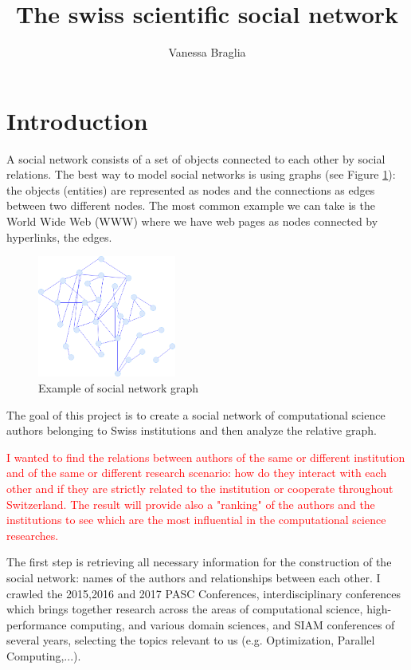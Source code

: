 \documentclass[]{usiinfbachelorproject}
\author{Vanessa Braglia}
\title{The swiss scientific social network}
\begin{document}
\newpage
\tableofcontents
\newpage

\section{Introduction} \label{sec:intro} 

A social network consists of a set of objects connected to each other by social relations. The best way to model social networks is using graphs (see Figure \ref{fig:socialnetwork}): the objects (entities) are represented as nodes and the connections as edges between two different nodes. The most common example we can take is the World Wide Web (WWW) where we have web pages as nodes connected by hyperlinks, the edges.

\begin{figure}[ht]
	\centering
	\includegraphics[height=4cm]{img/graph3.png}
	\caption{Example of social network graph}
	\label{fig:socialnetwork}
\end{figure}

The goal of this project is to create a social network of computational science authors belonging to Swiss institutions and then analyze the relative graph.

\textcolor{red}{I wanted to find the relations between authors of the same or different institution and of the same or different research scenario: how do they interact with each other and if they are strictly related to the institution or cooperate throughout Switzerland. The result will provide also a "ranking" of the authors and the institutions to see which are the most influential in the computational science researches.}

The first step is retrieving all necessary information for the construction of the social network: names of the authors and relationships between each other. I crawled the 2015,2016 and 2017 PASC Conferences, interdisciplinary conferences which brings together research across the areas of computational science, high-performance computing, and various domain sciences, and SIAM conferences of several years, selecting the topics relevant to us (e.g. Optimization, Parallel Computing,...).
\end{document}

